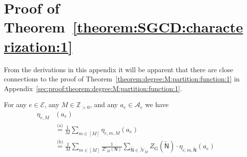 \documentclass[journal, twocolumn]{IEEEtran}
\newcommand{\Z}{\mathbb{Z}}
\newcommand{\Zpp}{\Z_{>0}}
\newcommand{\set}[1]{\mathcal{#1}}
\newcommand{\graph}[1]{\mathsf{#1}}
\newcommand{\onestareq}{\overset{\text{(a)}}{=}}
\newcommand{\twostarseq}{\overset{\text{(b)}}{=}}
\newcommand{\setA}{\set{A}}
\newcommand{\setE}{\set{E}}
\newcommand{\graphN}{\graph{N}}
\newcommand{\cover}[1]{\tilde{#1}}
\newcommand{\cset}[1]{\cover{\set{#1}}}
\newcommand{\cgraph}[1]{\cover{\graph{#1}}}
\newcommand{\?}{\mathrm{?}}
\newcommand{\ZGibbsext}[1]{Z_{\mathrm{G}}(#1)}
\begin{document}
\section{Proof of Theorem~\ref{theorem:SGCD:characterization:1}}
\label{sec:proof:theorem:SGCD:characterization:1}


From the derivations in this appendix it will be apparent that there are close
connections to the proof of
Theorem~\ref{theorem:degree:M:partition:function:1} in
Appendix~\ref{sec:proof:theorem:degree:M:partition:function:1}.

For any $e \in \setE$, any $M \in \Zpp$, and any $a_e \in \setA_e$ we have
\begin{align*}
  \eta_{e,M}&(a_e) \\
    &\onestareq
       \frac{1}{M}
       \sum_{m \in [M]}
         \eta_{e,m,M}(a_e) \\
    &\twostarseq
       \frac{1}{M}
       \sum_{m \in [M]}
         \frac{1}{Z'_M(\graphN)}
         \sum_{\cgraph{N} \in \cset{N}_M}
           \ZGibbsext{\cgraph{N}}
           \cdot
           \eta_{e,m,\cgraph{N}}(a_e) \\
  \end{align*}
\end{document}

